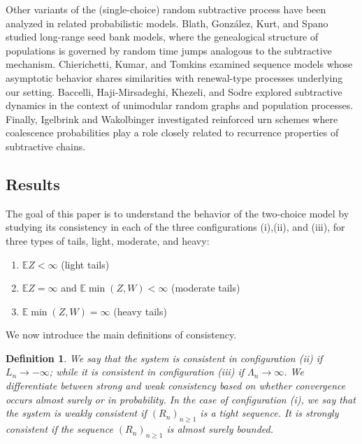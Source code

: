 \documentclass[12pt]{article}
\newcommand{\E}{\mathbb{E}}
\newtheorem{definition}[theorem]{Definition}
\numberwithin{equation}{section} \font\titre=cmbx12
\newcommand{\leftmost}{L}
\newcommand{\rightmost}{R}
\newcommand{\leaves}{\Lambda}
\begin{document}
\color{black}
Other variants of the (single-choice) random subtractive process have been analyzed in related probabilistic models. Blath, González, Kurt, and Spano \cite{BlGoKuSp13} studied long-range seed bank models, where the genealogical structure of populations is governed by random time jumps analogous to the subtractive mechanism. Chierichetti, Kumar, and Tomkins \cite{ChKuTo20} examined sequence models whose asymptotic behavior shares similarities with renewal-type processes underlying our setting. Baccelli, Haji-Mirsadeghi, Khezeli, and Sodre \cite{BaSo19, BaHaKh18, BaHaKh22} explored subtractive dynamics in the context of unimodular random graphs and population processes. Finally, Igelbrink and Wakolbinger \cite{IgWa22} investigated reinforced urn schemes where coalescence probabilities play a role closely related to recurrence properties of subtractive chains.
\color{black}



\subsection{Results}\label{sec: results}

The goal of this paper is to understand the behavior of the two-choice
model by studying its consistency in each of the three configurations
(i),(ii), and (iii), for three types of tails, light, moderate, and
heavy:
\begin{enumerate}%
        \item $\E Z < \infty$ (light tails)
        \item $\E Z = \infty$ and $\E \min(Z,W) < \infty$ (moderate tails)
        \item $\E \min(Z,W) = \infty$ (heavy tails)
\end{enumerate}

We now introduce the main definitions of consistency.
 


\begin{definition}
We say that the system is consistent in configuration (ii) if $\leftmost_n\to - \infty$; 
while it is consistent in configuration (iii) if $\leaves_n\to \infty$. 
We differentiate between strong and weak consistency based on whether
convergence occurs almost surely or in probability.
In the case of configuration (i), we say that the system is weakly consistent if $(\rightmost_n)_{n\ge 1}$ 
is a tight sequence. It is strongly consistent if the sequence $(\rightmost_n)_{n\ge 1}$ 
is almost surely bounded.
\end{definition}
\end{document}
